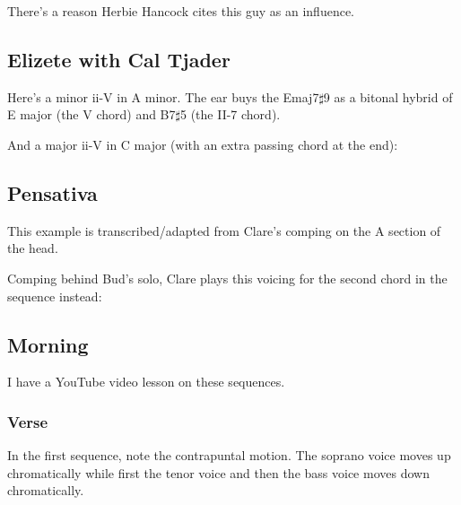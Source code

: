 There's a reason Herbie Hancock cites this guy as an influence.

\subsection{Elizete with Cal Tjader}

Here's a minor ii-V in A minor.  The ear buys the Emaj7$\sharp$9 as a bitonal hybrid of E major (the V chord) and B7$\sharp$5 (the II-7 chord).


And a major ii-V in C major (with an extra passing chord at the end):


\subsection{Pensativa}

This example is transcribed/adapted from Clare's comping on the A section of the head.


Comping behind Bud's solo, Clare plays this voicing for the second chord in the sequence instead:

\subsection{Morning}

I have a YouTube video lesson on these sequences.

\subsubsection{Verse}

In the first sequence, note the contrapuntal motion.  The soprano voice moves up chromatically while first the tenor voice and then the bass voice moves down chromatically.

